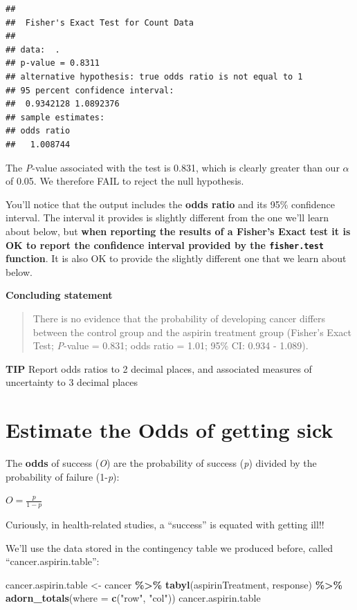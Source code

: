 \documentclass[
]{book}
\newenvironment{Shaded}{\begin{snugshade}}{\end{snugshade}}
\newcommand{\AttributeTok}[1]{\textcolor[rgb]{0.13,0.29,0.53}{#1}}
\newcommand{\FunctionTok}[1]{\textcolor[rgb]{0.13,0.29,0.53}{\textbf{#1}}}
\newcommand{\NormalTok}[1]{#1}
\newcommand{\OtherTok}[1]{\textcolor[rgb]{0.56,0.35,0.01}{#1}}
\newcommand{\SpecialCharTok}[1]{\textcolor[rgb]{0.81,0.36,0.00}{\textbf{#1}}}
\newcommand{\StringTok}[1]{\textcolor[rgb]{0.31,0.60,0.02}{#1}}
\begin{document}
\begin{verbatim}
## 
##  Fisher's Exact Test for Count Data
## 
## data:  .
## p-value = 0.8311
## alternative hypothesis: true odds ratio is not equal to 1
## 95 percent confidence interval:
##  0.9342128 1.0892376
## sample estimates:
## odds ratio 
##   1.008744
\end{verbatim}

The \emph{P}-value associated with the test is 0.831, which is clearly greater than our \(\alpha\) of 0.05. We therefore FAIL to reject the null hypothesis.

You'll notice that the output includes the \textbf{odds ratio} and its 95\% confidence interval. The interval it provides is slightly different from the one we'll learn about below, but \textbf{when reporting the results of a Fisher's Exact test it is OK to report the confidence interval provided by the \texttt{fisher.test} function}. It is also OK to provide the slightly different one that we learn about below.

\textbf{Concluding statement}

\begin{quote}
There is no evidence that the probability of developing cancer differs between the control group and the aspirin treatment group (Fisher's Exact Test; \emph{P}-value = 0.831; odds ratio = 1.01; 95\% CI: 0.934 - 1.089).
\end{quote}

\textbf{TIP}
Report odds ratios to 2 decimal places, and associated measures of uncertainty to 3 decimal places

\section{Estimate the Odds of getting sick}\label{odds}

The \textbf{odds} of success (\emph{O}) are the probability of success (\emph{p}) divided by the probability of failure (1-\emph{p}):

\(O = \frac{p}{1-p}\)

Curiously, in health-related studies, a ``success'' is equated with getting ill!!

We'll use the data stored in the contingency table we produced before, called ``cancer.aspirin.table'':

\begin{Shaded}
\begin{Highlighting}[]
\NormalTok{cancer.aspirin.table }\OtherTok{\textless{}{-}}\NormalTok{ cancer }\SpecialCharTok{\%\textgreater{}\%}
  \FunctionTok{tabyl}\NormalTok{(aspirinTreatment, response) }\SpecialCharTok{\%\textgreater{}\%}
  \FunctionTok{adorn\_totals}\NormalTok{(}\AttributeTok{where =} \FunctionTok{c}\NormalTok{(}\StringTok{"row"}\NormalTok{, }\StringTok{"col"}\NormalTok{))}
\NormalTok{cancer.aspirin.table }
\end{Highlighting}
\end{Shaded}
\end{document}
